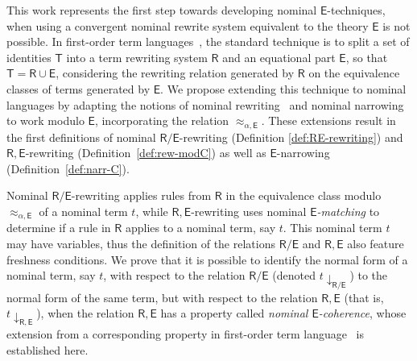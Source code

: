 \documentclass[submission,copyright,creativecommons]{eptcs}
\newcommand{\theory}[1]{\ensuremath{\mathsf{#1}}}
\theoremstyle{plain}
\theoremstyle{definition}
\theoremstyle{remark}
\begin{document}
 This work represents the first step towards developing nominal \theory{E}-techniques, when using a convergent nominal rewrite system equivalent to the theory $\theory{E}$ is not possible.  
 In first-order term languages~\cite{JouannaudKK83:Incremental, Viola01, VariantNarrowing:EscobarMS09}, the standard technique is to split a set of identities \theory{T}  into a term rewriting system $\theory{R}$ and an equational part $\theory{E}$, so that $\theory{T}=\theory{R}{\cup}\theory{E}$, considering the rewriting relation generated by $\theory{R}$ on the equivalence classes of terms generated by $\theory{E}$. We propose extending this technique to nominal languages by adapting the notions of nominal rewriting~\cite{NominalRewriting/FernandezG07,Kikuchi020,Kikuchi22} and nominal narrowing~\cite{NominalNarrowing16}  to work modulo $\theory{E}$, incorporating the relation $\approx_{\alpha,\theory{E}}$.  These extensions result in the first definitions of nominal \theory{R/E}-rewriting (Definition \ref{def:RE-rewriting}) and \theory{R,E}-rewriting (Definition~\ref{def:rew-modC}) as well as \theory{E}-narrowing (Definition~\ref{def:narr-C}).
 
 Nominal \theory{R/E}-rewriting applies rules from \theory{R} in the equivalence class modulo $\approx_{\alpha, \theory{E}}$ of a nominal term $t$, while \theory{R,E}-rewriting uses nominal {\em $\theory{E}$-matching} to determine if a rule in \theory{R} applies to a nominal term, say $t$. This nominal term $t$ may have variables, thus the definition of the relations \theory{R/E} and \theory{R,E} also feature freshness conditions. We prove that it is possible to identify the normal form of a nominal term, say $t$, with respect to the relation \theory{R/E} (denoted $t\downarrow_\theory{R/E}$) to the normal form of the same term, but with respect to the relation \theory{R,E} (that is,  $t\downarrow_\theory{R,E}$), when the relation \theory{R,E} has a property called {\em nominal \theory{E}-coherence}, whose extension from a corresponding property in first-order term language~\cite{Jouannaud83:ConfluentandCoherent} is established here.
 
 
 
\end{document}
